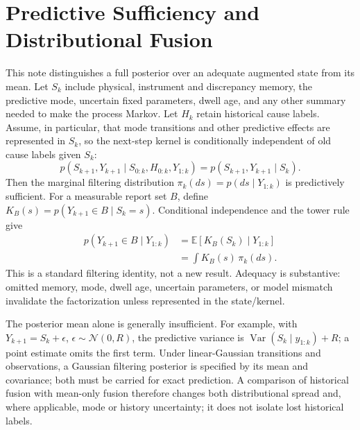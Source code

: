 \section{Predictive Sufficiency and Distributional Fusion}
\label{sec:recovery-distribution}

This note distinguishes a full posterior over an adequate augmented state from
its mean. Let $S_k$ include physical, instrument and discrepancy memory, the
predictive mode, uncertain fixed parameters, dwell age, and any other summary
needed to make the process Markov. Let $H_k$ retain historical cause labels.
Assume, in particular, that mode transitions and other predictive effects are
represented in $S_k$, so the next-step kernel is conditionally independent
of old cause labels given $S_k$:
\[
 p(S_{k+1},Y_{k+1}\mid S_{0:k},H_{0:k},Y_{1:k})
 =p(S_{k+1},Y_{k+1}\mid S_k).
\]
Then the marginal filtering distribution $\pi_k(ds)=p(ds\mid Y_{1:k})$
is predictively sufficient. For a measurable report set $B$, define
$K_B(s)=p(Y_{k+1}\in B\mid S_k=s)$. Conditional independence and the
tower rule give
\begin{align*}
 p(Y_{k+1}\in B\mid Y_{1:k})
 &=\mathbb E[K_B(S_k)\mid Y_{1:k}]\\
 &=\int K_B(s)\,\pi_k(ds).
\end{align*}
This is a standard filtering identity, not a new result. Adequacy is substantive:
omitted memory, mode, dwell age, uncertain parameters, or model mismatch
invalidate the factorization unless represented in the state/kernel.

The posterior mean alone is generally insufficient. For example, with
$Y_{k+1}=S_k+\epsilon$, $\epsilon\sim\mathcal N(0,R)$, the predictive
variance is $\operatorname{Var}(S_k\mid y_{1:k})+R$; a point estimate omits
the first term. Under linear-Gaussian transitions and observations, a
Gaussian filtering posterior is specified by its mean and covariance;
both must be carried for exact prediction. A comparison of historical fusion with mean-only
fusion therefore changes both distributional spread and, where applicable,
mode or history uncertainty; it does not isolate lost historical labels.

